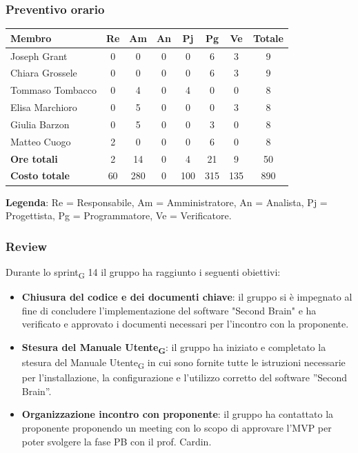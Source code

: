 \documentclass[11pt,a4paper]{article}
\newcommand{\gls}[1]{#1\textsubscript{G}}
\begin{document}
\subsubsection{Preventivo orario}
\begin{center}
    \begin{tabular}{|l|c|c|c|c|c|c|c|}
        \hline
        \textbf{Membro} & \textbf{Re} & \textbf{Am} & \textbf{An} & \textbf{Pj} & \textbf{Pg} & \textbf{Ve} & \textbf{Totale} \\
        \hline
        Joseph Grant & 0 & 0 & 0 & 0 & 6 & 3 & 9 \\
        \hline
        Chiara Grossele & 0 & 0 & 0 & 0 & 6 & 3 & 9 \\
        \hline
        Tommaso Tombacco & 0 & 4 & 0 & 4 & 0 & 0 & 8 \\
        \hline
        Elisa Marchioro & 0 & 5 & 0 & 0 & 0 & 3 & 8 \\
        \hline
        Giulia Barzon & 0 & 5 & 0 & 0 & 3 & 0 & 8 \\
        \hline
        Matteo Cuogo & 2 & 0 & 0 & 0 & 6 & 0 & 8 \\
        \hline
        \textbf{Ore totali} & 2 & 14 & 0 & 4 & 21 & 9 & 50 \\
        \hline
        \textbf{Costo totale} & 60 & 280 & 0 & 100 & 315 & 135 & 890 \\
        \hline
    \end{tabular}
\end{center}

\noindent \textbf{Legenda}: Re = Responsabile, Am = Amministratore, An = Analista, Pj = Progettista, Pg = Programmatore, Ve = Verificatore.

\subsubsection{Review}
Durante lo \gls{sprint} 14 il gruppo ha raggiunto i seguenti obiettivi:
\begin{itemize}
    \item \textbf{Chiusura del codice e dei documenti chiave}: il gruppo si è impegnato al fine di concludere l'implementazione del software "Second Brain" e ha verificato e approvato i documenti necessari per l'incontro con la proponente.
    \item \textbf{Stesura del \gls{Manuale Utente}}: il gruppo ha iniziato e completato la stesura del \gls{Manuale Utente} in cui sono fornite tutte le istruzioni necessarie per l’installazione, la configurazione e l’utilizzo corretto del software ”Second Brain”.
    \item \textbf{Organizzazione incontro con proponente}: il gruppo ha contattato la proponente proponendo un meeting con lo scopo di approvare l'MVP per poter svolgere la fase PB con il prof. Cardin.
\end{itemize}
\end{document}

